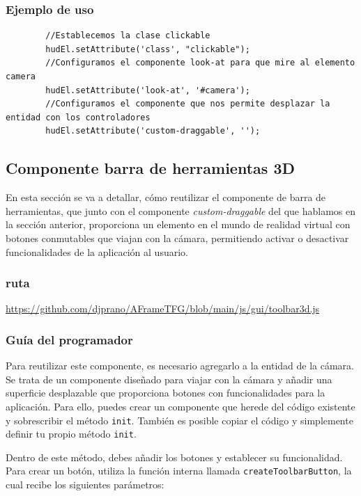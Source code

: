 \documentclass[a4paper, 11pt]{book}
\begin{document}
\subsubsection{Ejemplo de uso}
{\scriptsize
	\begin{verbatim}
		//Establecemos la clase clickable
		hudEl.setAttribute('class', "clickable");
		//Configuramos el componente look-at para que mire al elemento camera
		hudEl.setAttribute('look-at', '#camera');
		//Configuramos el componente que nos permite desplazar la entidad con los controladores
		hudEl.setAttribute('custom-draggable', '');
	\end{verbatim}
}
\subsection{Componente barra de herramientas 3D}
En esta sección se va a detallar, cómo reutilizar el componente de barra de herramientas, que junto con el componente \emph{custom-draggable} del que hablamos en la sección anterior, proporciona un elemento en el mundo de realidad virtual con botones conmutables que viajan con la cámara, permitiendo activar o desactivar funcionalidades de la aplicación al usuario.
\subsubsection{ruta}
{\scriptsize
	\url{https://github.com/djprano/AFrameTFG/blob/main/js/gui/toolbar3d.js}
}
\subsubsection{Guía del programador}
\label{subsec:guiaBarra3d}
Para reutilizar este componente, es necesario agregarlo a la entidad de la cámara. Se trata de un componente diseñado para viajar con la cámara y añadir una superficie desplazable que proporciona botones con funcionalidades para la aplicación.
Para ello, puedes crear un componente que herede del código existente y sobrescribir el método \texttt{init}. También es posible copiar el código y simplemente definir tu propio método \texttt{init}.

Dentro de este método, debes añadir los botones y establecer su funcionalidad. Para crear un botón, utiliza la función interna llamada \texttt{createToolbarButton}, la cual recibe los siguientes parámetros:
\end{document}
